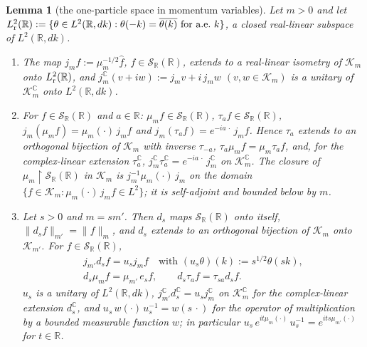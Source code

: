 \documentclass[11pt,a4paper]{article}
\theoremstyle{plain}
\newtheorem{lemma}[theorem]{Lemma}
\theoremstyle{definition}
\theoremstyle{plain}
\theoremstyle{definition}
\newcommand{\R}{\mathbb{R}}
\newcommand{\C}{\mathbb{C}}
\begin{document}
\begin{lemma}[the one-particle space in momentum variables]\label{lem:ff-onepart}
Let $m>0$ and let $L^2_{\rm r}(\R):=\{\theta\in L^2(\R,dk):\theta(-k)=\overline{\theta(k)}
\text{ for a.e.\ }k\}$, a closed real-linear subspace of $L^2(\R,dk)$.
\begin{enumerate}
\item[\textup{(i)}] The map $j_mf:=\mu_m^{-1/2}\hat f$, $f\in\mathcal S_\R(\R)$, extends to a
real-linear isometry of $\mathcal K_m$ onto $L^2_{\rm r}(\R)$, and $j_m^{\C}(v+iw):=j_mv+i\,j_mw$
$(v,w\in\mathcal K_m)$ is a unitary of $\mathcal K_m^{\C}$ onto $L^2(\R,dk)$.
\item[\textup{(ii)}] For $f\in\mathcal S_\R(\R)$ and $a\in\R$: $\mu_mf\in\mathcal S_\R(\R)$,
$\tau_af\in\mathcal S_\R(\R)$, $j_m(\mu_mf)=\mu_m(\cdot)\,j_mf$ and
$j_m(\tau_af)=e^{-ia\,\cdot}\,j_mf$.  Hence $\tau_a$ extends to an orthogonal bijection of
$\mathcal K_m$ with inverse $\tau_{-a}$, $\tau_a\mu_mf=\mu_m\tau_af$, and, for the
complex-linear extension $\tau_a^{\C}$, $j_m^{\C}\tau_a^{\C}=e^{-ia\,\cdot}\,j_m^{\C}$ on
$\mathcal K_m^{\C}$.  The closure of $\mu_m\upharpoonright\mathcal S_\R(\R)$ in $\mathcal K_m$
is $j_m^{-1}\mu_m(\cdot)\,j_m$ on the domain $\{f\in\mathcal K_m:\mu_m(\cdot)\,j_mf\in L^2\}$;
it is self-adjoint and bounded below by $m$.
\item[\textup{(iii)}] Let $s>0$ and $m=sm'$.  Then $d_s$ maps $\mathcal S_\R(\R)$ onto itself,
$\|d_sf\|_{m'}=\|f\|_m$, and $d_s$ extends to an orthogonal bijection of $\mathcal K_m$ onto
$\mathcal K_{m'}$.  For $f\in\mathcal S_\R(\R)$,
\begin{gather*}
 j_{m'}d_sf=u_sj_mf\quad\text{with }(u_s\theta)(k):=s^{1/2}\theta(sk),\\
 d_s\mu_mf=\mu_{m'}\,e_sf,\qquad d_s\tau_af=\tau_{sa}d_sf .
\end{gather*}
$u_s$ is a unitary of $L^2(\R,dk)$, $j_{m'}^{\C}d_s^{\C}=u_sj_m^{\C}$ on $\mathcal K_m^{\C}$
for the complex-linear extension $d_s^{\C}$, and $u_s\,w(\cdot)\,u_s^{-1}=w(s\,\cdot)$ for the
operator of multiplication by a bounded measurable function $w$; in particular
$u_s\,e^{it\mu_m(\cdot)}\,u_s^{-1}=e^{its\mu_{m'}(\cdot)}$ for $t\in\R$.
\end{enumerate}
\end{lemma}
\end{document}

